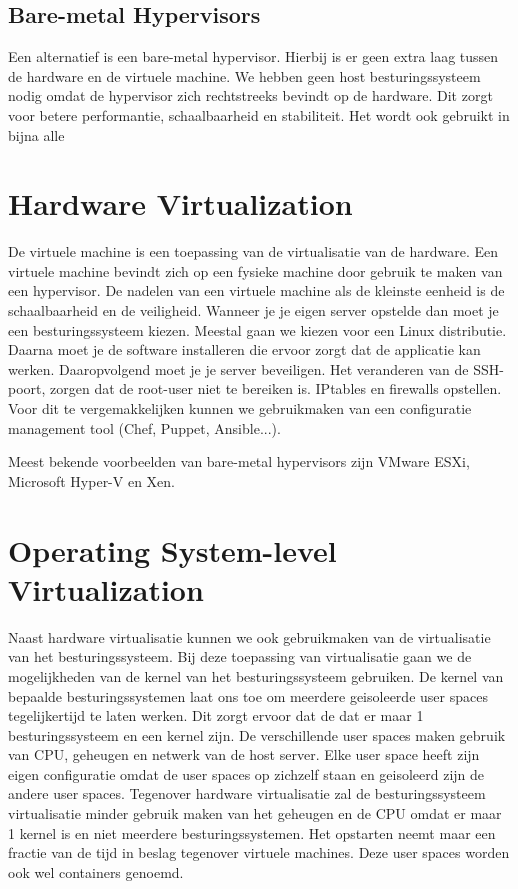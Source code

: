 \documentclass[pdftex,a4paper,12pt,twoside]{report}
\begin{document}
\subsection{Bare-metal Hypervisors}

Een alternatief is een bare-metal hypervisor. Hierbij is er geen extra laag tussen de hardware en de virtuele machine. We hebben geen host besturingssysteem nodig omdat de hypervisor zich rechtstreeks bevindt op de hardware. Dit zorgt voor betere performantie, schaalbaarheid en stabiliteit. Het wordt ook gebruikt in bijna alle  \\

\section{Hardware Virtualization}

De virtuele machine is een toepassing van de virtualisatie van de hardware. Een virtuele machine bevindt zich op een fysieke machine door gebruik te maken van een hypervisor. De nadelen van een virtuele machine als de kleinste eenheid is de schaalbaarheid en de veiligheid. Wanneer je je eigen server opstelde dan moet je een besturingssysteem kiezen. Meestal gaan we kiezen voor een Linux distributie. Daarna moet je de software installeren die ervoor zorgt dat de applicatie kan werken. Daaropvolgend moet je je server beveiligen. Het veranderen van de SSH-poort, zorgen dat de root-user niet te bereiken is. IPtables en firewalls opstellen. Voor dit te vergemakkelijken kunnen we gebruikmaken van een configuratie management tool (Chef, Puppet, Ansible...).

Meest bekende voorbeelden van bare-metal hypervisors zijn VMware ESXi, Microsoft Hyper-V en Xen.

\section{Operating System-level Virtualization}

Naast hardware virtualisatie kunnen we ook gebruikmaken van de virtualisatie van het besturingssysteem. Bij deze toepassing van virtualisatie gaan we de mogelijkheden van de kernel van het besturingssysteem gebruiken. De kernel van bepaalde besturingssystemen laat ons toe om meerdere geisoleerde user spaces tegelijkertijd te laten werken. Dit zorgt ervoor dat de dat er maar 1 besturingssysteem en een kernel zijn. De verschillende user spaces maken gebruik van CPU, geheugen en netwerk van de host server. Elke user space heeft zijn eigen configuratie omdat de user spaces op zichzelf staan en geisoleerd zijn de andere user spaces. Tegenover hardware virtualisatie zal de besturingssysteem virtualisatie minder gebruik maken van het geheugen en de CPU omdat er maar 1 kernel is en niet meerdere besturingssystemen. Het opstarten neemt maar een fractie van de tijd in beslag tegenover virtuele machines. Deze user spaces worden ook wel containers genoemd. 
\end{document}
